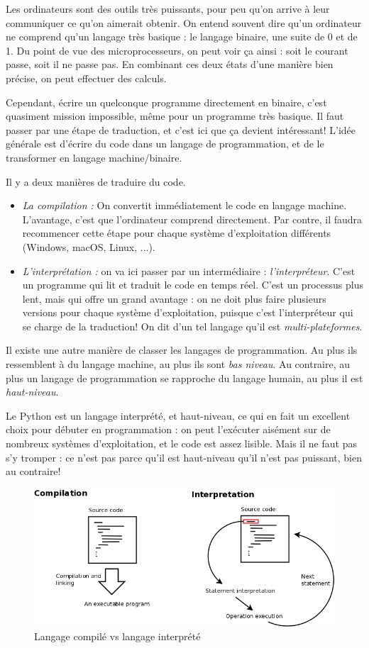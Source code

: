 Les ordinateurs sont des outils très puissants, pour peu qu'on arrive à leur communiquer ce qu'on aimerait obtenir. On entend souvent dire qu'un ordinateur ne comprend qu'un langage très basique : le langage binaire, une suite de 0 et de 1. Du point de vue des microprocesseurs, on peut voir ça ainsi : soit le courant passe, soit il ne passe pas. En combinant ces deux états d'une manière bien précise, on peut effectuer des calculs.

Cependant, écrire un quelconque programme directement en binaire, c'est quasiment mission impossible, même pour un programme très basique. Il faut passer par une étape de traduction, et c'est ici que ça devient intéressant! L'idée générale est d'écrire du code dans un langage de programmation, et de le transformer en langage machine/binaire.

Il y a deux manières de traduire du code.
\begin{itemize}
    \item \emph{La compilation :} On convertit immédiatement le code en langage machine. L'avantage, c'est que l'ordinateur comprend directement. Par contre, il faudra recommencer cette étape pour chaque système d'exploitation différents (Windows, macOS, Linux, ...).
    \item \emph{L'interprétation :} on va ici passer par un intermédiaire : \textit{l'interpréteur}. C'est un programme qui lit et traduit le code en temps réel. C'est un processus plus lent, mais qui offre un grand avantage : on ne doit plus faire plusieurs versions pour chaque système d'exploitation, puisque c'est l'interpréteur qui se charge de la traduction! On dit d'un tel langage qu'il est \textit{multi-plateformes}.
\end{itemize}


Il existe une autre manière de classer les langages de programmation. Au plus ils ressemblent à du langage machine, au plus ils sont \textit{bas niveau}. Au contraire, au plus un langage de programmation se rapproche du langage humain, au plus il est \textit{haut-niveau}.

Le Python est un langage interprété, et haut-niveau, ce qui en fait un excellent choix pour débuter en programmation : on peut l'exécuter aisément sur de nombreux systèmes d'exploitation, et le code est assez lisible. Mais il ne faut pas s'y tromper : ce n'est pas parce qu'il est haut-niveau qu'il n'est pas puissant, bien au contraire!

\begin{figure}[t]
	\includegraphics[width=\textwidth]{inter.png}
	\caption{Langage compilé vs langage interprété}
\end{figure}
